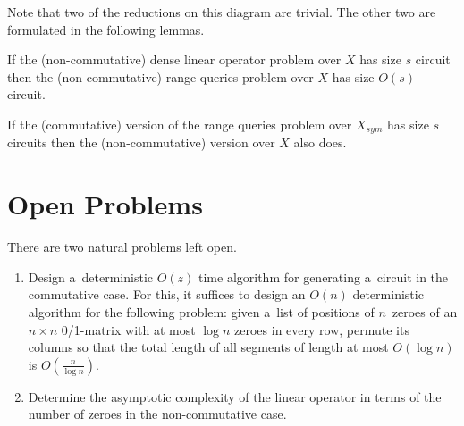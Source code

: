 \documentclass[a4paper,UKenglish,cleveref, autoref]{lipics-v2019}
\begin{document}
Note that two of the reductions on this diagram are trivial. The other two are formulated in the following lemmas.


%
%

\begin{lemma} \label{lem:dense_matrices}
If the (non-commutative) dense linear operator problem over $X$ has size $s$ circuit then the (non-commutative) range queries problem over $X$ has size $O(s)$ circuit.
\end{lemma}

\begin{lemma} \label{lem:intervals}
If the (commutative) version of the range queries problem over $X_{sym}$ has size $s$ circuits then the (non-commutative) version over $X$ also does.
\end{lemma}






\section{Open Problems}
There are two natural problems left open.
\begin{enumerate}
\item Design a~deterministic $O(z)$ time algorithm for generating
a~circuit in the commutative case.
For this, it suffices to design an $O(n)$ deterministic algorithm for the following problem: given a~list of positions
of $n$~zeroes of an $n \times n$ 0/1-matrix with at most $\log n$ zeroes in every row, permute its columns so that the total length of all segments of length at most $O(\log n)$ is $O(\frac{n}{\log n})$.
\item Determine the asymptotic complexity of the linear operator in terms of the number of zeroes in the non-commutative case.
\end{enumerate}
\end{document}
